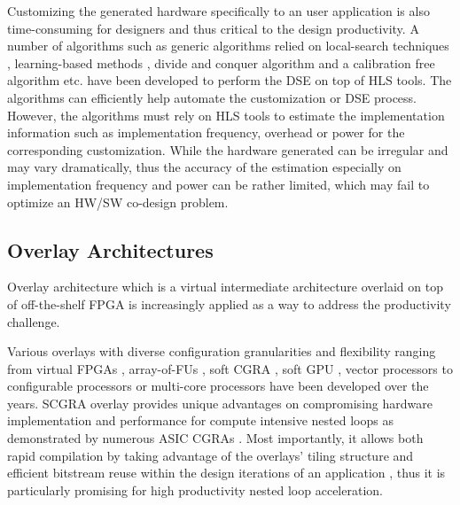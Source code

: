 Customizing the generated hardware specifically to an user 
application is also time-consuming for designers and thus critical to the design 
productivity. A number of algorithms such as generic algorithms 
relied on local-search techniques \cite{schafer2009adaptive, 
sengupta1997genetic}, learning-based methods \cite{onlinecustomization, 
carrion2012machine}, divide and conquer algorithm \cite{DCcustomization} 
and a calibration free algorithm \cite{RCcustomization} etc. have been developed 
to perform the DSE on top of HLS tools. The algorithms can efficiently help automate the 
customization or DSE process. However, the algorithms must rely on HLS tools 
to estimate the implementation information such as implementation frequency, 
overhead or power for the corresponding customization. While the hardware generated 
can be irregular and may vary dramatically, thus the accuracy of the estimation 
especially on implementation frequency and power can be rather limited, which may
fail to optimize an HW/SW co-design problem.  

\subsection{Overlay Architectures}
Overlay architecture which is a virtual intermediate architecture overlaid on 
top of off-the-shelf FPGA is increasingly applied as a way to address the 
productivity challenge. 

Various overlays with diverse configuration granularities and flexibility 
ranging from virtual FPGAs \cite{Grant2011Malibu, ZUMA2012}, 
array-of-FUs \cite{mesh-FUs,ferreira2011fpga}, soft 
CGRA \cite{kissler2006dynamically, scgra-orig}, soft GPU \cite{Guppy2012GPU-Like}, 
vector processors\cite{Yiannacouras2009FPS, MXP2013} to 
configurable processors or multi-core processors \cite{unnikrishnan2009application, 
MARC2010, Yiannacouras2007Exploration, Capalija2009coarse-grain, OCTAVO2012, iDEA2012} 
have been developed over the years. SCGRA overlay provides unique 
advantages on compromising hardware implementation 
and performance for compute intensive nested loops as demonstrated 
by numerous ASIC CGRAs \cite{tessier2001reconfigurable, compton2002reconfigurable}.
Most importantly, it allows both rapid compilation by taking advantage of 
the overlays' tiling structure \cite{ROB2014} and efficient bitstream 
reuse within the design iterations of an application \cite{scgra-orig}, 
thus it is particularly promising for high productivity nested loop acceleration.

